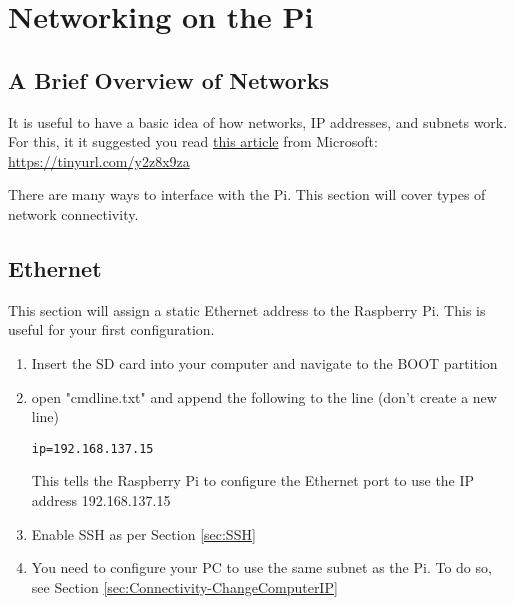 \section{Networking on the Pi}
\subsection{A Brief Overview of Networks}
\label{app:UnderstandingNetworks}
It is useful to have a basic idea of how networks, IP addresses, and subnets work. For this, it it suggested you read \href{https://support.microsoft.com/en-za/help/164015/understanding-tcp-ip-addressing-and-subnetting-basics}{this article} from Microsoft: \href{https://tinyurl.com/y2z8x9za}{https://tinyurl.com/y2z8x9za}

\label{app:NetworkingOnThePi}
There are many ways to interface with the Pi. This section will cover types of network connectivity.

\subsection{Ethernet}
\label{sec:Connectivity-Ethernet}
This section will assign a static Ethernet address to the Raspberry Pi. This is useful for your first configuration.
\begin{enumerate}
    \item Insert the SD card into your computer and navigate to the BOOT partition
    \item open "cmdline.txt" and append the following to the line (don't create a new line)
        \begin{verbatim}ip=192.168.137.15\end{verbatim} 
        This tells the Raspberry Pi to configure the Ethernet port to use the IP address 192.168.137.15
    \item Enable SSH as per Section \ref{sec:SSH}
    \item You need to configure your PC to use the same subnet as the Pi. To do so, see Section \ref{sec:Connectivity-ChangeComputerIP}
\end{enumerate}

